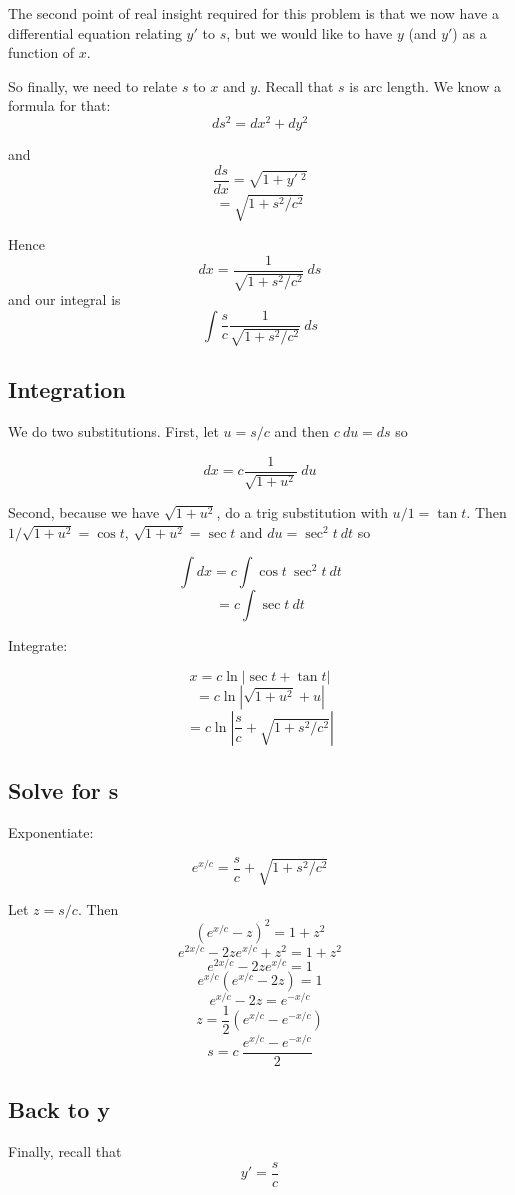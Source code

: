 \documentclass[11pt, oneside]{article}
\begin{document}
The second point of real insight required for this problem is that we now have a differential equation relating $y'$ to $s$, but we would like to have $y$ (and $y'$) as a function of $x$.

So finally, we need to relate $s$ to $x$ and $y$.  Recall that $s$ is arc length.  We know a formula for that:
\[ ds^2 = dx^2 + dy^2 \]

and
\[  \frac{ds}{dx} = \sqrt{1 + y'\ ^2} \]
\[ = \sqrt{1 + s^2/c^2} \]

Hence
\[  dx = \frac{1}{\sqrt{1 + s^2/c^2}} \ ds  \]
and our integral is
\[ \int \frac{s}{c}  \frac{1}{\sqrt{1 + s^2/c^2}} \ ds  \]

\subsection*{Integration}

We do two substitutions.  First, let $u = s/c$ and then $c \ du = ds$ so

\[  dx = c \frac{1}{\sqrt{1 + u^2}} \ du  \]

Second, because we have $\sqrt{1 + u^2}$, do a trig substitution with $u/1 = \tan t$.  Then $1/\sqrt{1 + u^2} = \cos t$, $\sqrt{1 + u^2} = \sec t$ and $du = \sec^2 t \ dt$ so

\[  \int dx = c \int \cos t \ \sec^2 t \ dt  \]
\[ = c \int \sec t \ dt \]

Integrate:

\[ x = c \ln | \sec t + \tan t |  \]
\[ = c \ln | \sqrt{1 + u^2} + u | \]
\[ = c \ln | \frac{s}{c} + \sqrt{1 + s^2/c^2} | \]

\subsection*{Solve for s}

Exponentiate:

\[  e^{x/c} = \frac{s}{c} + \sqrt{1 + s^2/c^2} \]

Let $z = s/c$.  Then
\[ (e^{x/c} - z)^2 = 1 + z^2 \]
\[ e^{2x/c} - 2 z e^{x/c} + z^2 = 1 + z^2 \]
\[ e^{2x/c} - 2 z e^{x/c} = 1 \]
\[ e^{x/c}(e^{x/c} - 2z) = 1 \]
\[ e^{x/c} - 2z = e^{-x/c} \]
\[ z = \frac{1}{2} (e^{x/c} - e^{-x/c}) \]
\[ s = c \ \frac{e^{x/c} - e^{-x/c}}{2} \]

\subsection*{Back to y}
Finally, recall that
\[  y' = \frac{s}{c} \]
    
\end{document}
